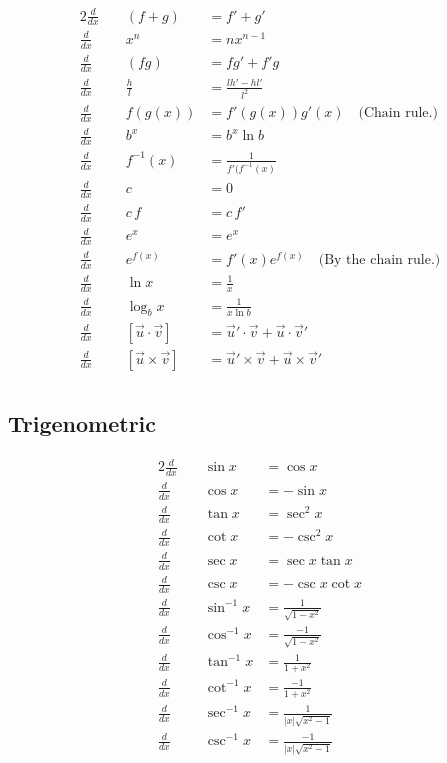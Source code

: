 \documentclass[knowledge]{rbt-mathnotes}
\def \ddx { \frac{d}{dx} }
\begin{document}
\begin{alignat*}{2}
  \ddx&\;& (f + g) &= f' + g' \\
  \ddx&& x^n &= nx^{n - 1} \\
  \ddx&& (fg) &= fg' + f'g \\
  \ddx&& \frac{h}{l} &= \frac{l h' - h l'}{l^2} \\
  \ddx&& f(g(x)) &= f'(g(x)) g'(x) \quad\text{(Chain rule.)} \\
  \ddx&& b^x &= b^x \ln b \\
  \ddx&& f^{-1}(x) &= \frac{1}{f'(f^{-1}(x)} \\
  \ddx&& c &= 0 \\
  \ddx&& c\,f &= c\,f' \\
  \ddx&& e^x &= e^x \\
  \ddx&& e^{f(x)} &= f'(x) e^{f(x)} \quad\text{(By the chain rule.)}  \\
  \ddx&& \ln x &= \frac{1}{x} \\
  \ddx&& \log_b x &= \frac{1}{x \ln b} \\
  \ddx&& [\vec u \cdot \vec v] &= \vec u' \cdot \vec v + \vec u \cdot \vec v' \\
  \ddx&& [\vec u \times \vec v] &= \vec u' \times \vec v + \vec u \times \vec v' \\
\end{alignat*}

\subsection{Trigenometric}
\begin{alignat*}{2}
  \ddx&\;& \sin x &= \cos x \\
  \ddx&& \cos x &= -\sin x \\
  \ddx&& \tan x &= \sec^2 x \\
  \ddx&& \cot x &= -\csc^2 x \\
  \ddx&& \sec x &=  \sec x \tan x \\
  \ddx&& \csc x &=  -\csc x \cot x \\
  \ddx&& \sin^{-1} x &= \frac{ 1}{\sqrt{1 - x^2}} \\
  \ddx&& \cos^{-1} x &= \frac{-1}{\sqrt{1 - x^2}} \\
  \ddx&& \tan^{-1} x &= \frac{ 1}{1 + x^2} \\
  \ddx&& \cot^{-1} x &= \frac{-1}{1 + x^2} \\
  \ddx&& \sec^{-1} x &= \frac{ 1}{|x| \sqrt{x^2 - 1}} \\
  \ddx&& \csc^{-1} x &= \frac{-1}{|x| \sqrt{x^2 - 1}} \\
\end{alignat*}
\end{document}
